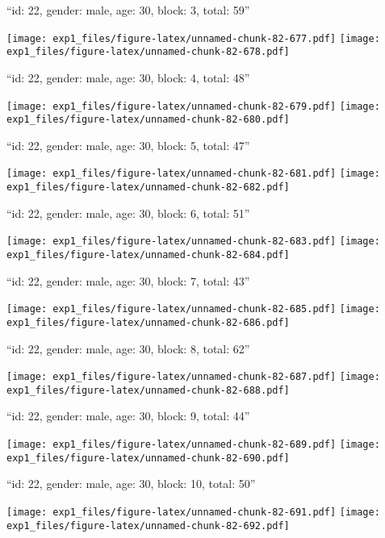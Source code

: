 \documentclass[11pt,,]{article}
\begin{document}
\newpage
[1] 

``id: 22, gender: male, age: 30, block: 3, total: 59''

\texttt{[image: exp1\_files/figure-latex/unnamed-chunk-82-677.pdf]}
\texttt{[image: exp1\_files/figure-latex/unnamed-chunk-82-678.pdf]}

\newpage
[1] 

``id: 22, gender: male, age: 30, block: 4, total: 48''

\texttt{[image: exp1\_files/figure-latex/unnamed-chunk-82-679.pdf]}
\texttt{[image: exp1\_files/figure-latex/unnamed-chunk-82-680.pdf]}

\newpage
[1] 

``id: 22, gender: male, age: 30, block: 5, total: 47''

\texttt{[image: exp1\_files/figure-latex/unnamed-chunk-82-681.pdf]}
\texttt{[image: exp1\_files/figure-latex/unnamed-chunk-82-682.pdf]}

\newpage
[1] 

``id: 22, gender: male, age: 30, block: 6, total: 51''

\texttt{[image: exp1\_files/figure-latex/unnamed-chunk-82-683.pdf]}
\texttt{[image: exp1\_files/figure-latex/unnamed-chunk-82-684.pdf]}

\newpage
[1] 

``id: 22, gender: male, age: 30, block: 7, total: 43''

\texttt{[image: exp1\_files/figure-latex/unnamed-chunk-82-685.pdf]}
\texttt{[image: exp1\_files/figure-latex/unnamed-chunk-82-686.pdf]}

\newpage
[1] 

``id: 22, gender: male, age: 30, block: 8, total: 62''

\texttt{[image: exp1\_files/figure-latex/unnamed-chunk-82-687.pdf]}
\texttt{[image: exp1\_files/figure-latex/unnamed-chunk-82-688.pdf]}

\newpage
[1] 

``id: 22, gender: male, age: 30, block: 9, total: 44''

\texttt{[image: exp1\_files/figure-latex/unnamed-chunk-82-689.pdf]}
\texttt{[image: exp1\_files/figure-latex/unnamed-chunk-82-690.pdf]}

\newpage
[1] 

``id: 22, gender: male, age: 30, block: 10, total: 50''

\texttt{[image: exp1\_files/figure-latex/unnamed-chunk-82-691.pdf]}
\texttt{[image: exp1\_files/figure-latex/unnamed-chunk-82-692.pdf]}
\end{document}
